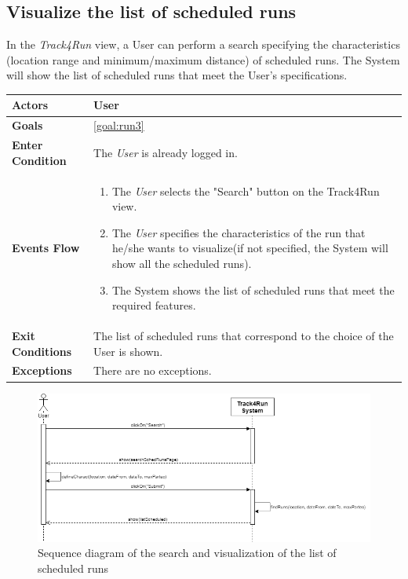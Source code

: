  \subsection{Visualize the list of scheduled runs}
In the \emph{Track4Run} view, a User can perform a search specifying the characteristics (location range and minimum/maximum distance) of scheduled runs. The System will show the list of scheduled runs that meet the User's specifications. 

\begin{table}[H]
	\centering
    
    \begin{tabular}{|p{3.5cm}|p{10.3cm}|}
    
    \hline
    \textbf{\large{Actors}} & User	\\	 			
    \hline
    \textbf{\large{Goals}} 				& \ref{goal:run3}\\
    
    \hline
    \textbf{\large{Enter Condition}}	& The \emph{User} is already logged in.		\\
    
    \hline
    \textbf{\large{Events Flow}}		& \begin{enumerate}[leftmargin=0.5cm]
            	                            \item The \emph{User} selects the "Search" button on the Track4Run view.
                                          	\item The \emph{User} specifies the characteristics of the run that he/she wants to visualize(if not specified, the System will show all the scheduled runs).  
                                          	 \item The System shows the list of scheduled runs that meet the required features.
                                          \end{enumerate}
    										\\
    \hline
    \textbf{\large{Exit Conditions}}    & The list of scheduled runs that correspond to the choice of the User is shown.  \\
    
    \hline
    \textbf{\large{Exceptions}} 		& There are no exceptions.\\
    
    \hline
    
    
    \end{tabular}
	
\end{table}

\begin{figure}[H]
    \centering
    \includegraphics[scale=0.4]{Pictures/visListSchedRunsSeqDiag.png}
    \caption{Sequence diagram of the search and visualization of the list of scheduled runs}
\end{figure}
